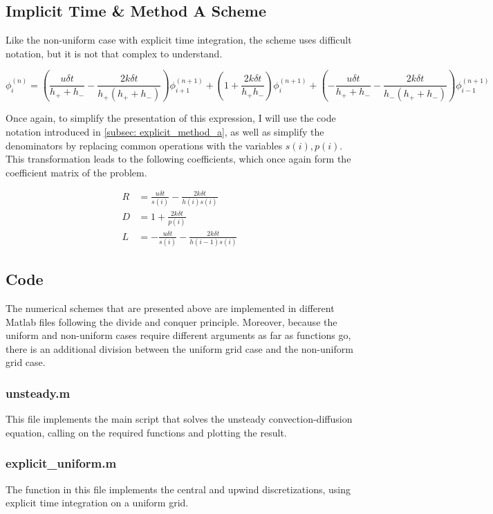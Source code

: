 \subsection{Implicit Time \& Method A Scheme}
Like the non-uniform case with explicit time integration, the scheme uses difficult notation, but it is not that complex to understand. 

\[
	\phi_{i}^{(n)} = \left( \frac{u \delta t}{h_{+} + h_{-}} - \frac{2k \delta t}{h_{+} (h_{+} + h_{-})} \right) \phi_{i+1}^{(n+1)} + \left( 1 + \frac{2k \delta t}{h_{+}h_{-}} \right) \phi_{i}^{(n+1)} + \left( - \frac{u \delta t}{h_{+} + h_{-}} - \frac{2k \delta t}{h_{-} (h_{+} + h_{-})} \right) \phi_{i-1}^{(n+1)}
\]

Once again, to simplify the presentation of this expression, I will use the code notation introduced in \ref{subsec: explicit_method_a}, as well as simplify the denominators by replacing common operations with the variables \( s(i), p(i) \). This transformation leads to the following coefficients, which once again form the coefficient matrix of the problem.

\begin{align*}
	R &= \frac{u \delta t}{s(i)} - \frac{2k \delta t}{h(i) s(i)} \\
	D &= 1 + \frac{2k \delta t}{p(i)} \\
	L &= - \frac{u \delta t}{s(i)} -\frac{2k \delta t}{h(i-1) s(i)} 
\end{align*}

\subsection{Code}
The numerical schemes that are presented above are implemented in different Matlab files following the divide and conquer principle. Moreover, because the uniform and non-uniform cases require different arguments as far as functions go, there is an additional division between the uniform grid case and the non-uniform grid case. 

\subsubsection{unsteady.m}
\label{subsubsec: unsteady}
This file implements the main script that solves the unsteady convection-diffusion equation, calling on the required functions and plotting the result.


\subsubsection{explicit\_uniform.m}
The function in this file implements the central and upwind discretizations, using explicit time integration on a uniform grid.


